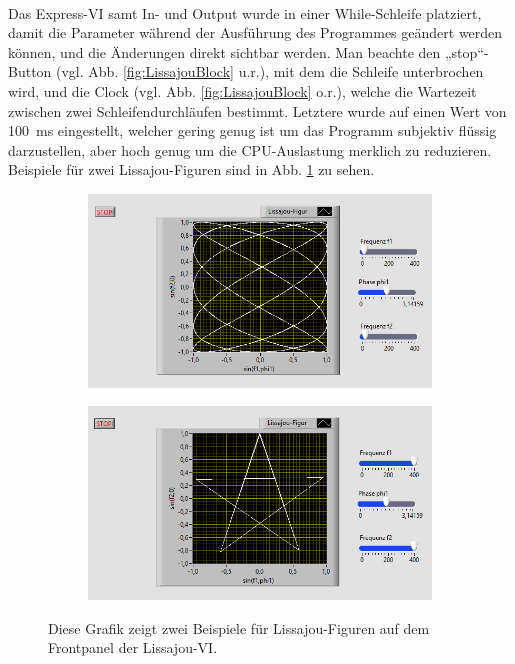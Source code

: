 \

Das Express-VI samt In- und Output wurde in einer While-Schleife platziert, damit die Parameter während der Ausführung des Programmes geändert werden können, und die Änderungen direkt sichtbar werden. Man beachte den „stop“-Button (vgl. Abb. \ref{fig:LissajouBlock} u.r.), mit dem die Schleife unterbrochen wird, und die Clock (vgl. Abb. \ref{fig:LissajouBlock} o.r.), welche die Wartezeit zwischen zwei Schleifendurchläufen bestimmt. Letztere wurde auf einen Wert von \SI{100}{\milli\second} eingestellt, welcher gering genug ist um das Programm subjektiv flüssig darzustellen, aber hoch genug um die CPU-Auslastung merklich zu reduzieren.
Beispiele für zwei Lissajou-Figuren sind in Abb. \ref{fig:LissajouFront} zu sehen.
\

\begin{figure}[H]
	\centering
	\begin{subfigure}[c]{\textwidth}
		\centering
		\includegraphics[width=\textwidth]{pic/LissFront1.png}
	\end{subfigure}
	\begin{subfigure}[c]{\textwidth}
		\centering
		\includegraphics[width=\textwidth]{pic/LissFront2.png}
	\end{subfigure}
	\caption{Diese Grafik zeigt zwei Beispiele für Lissajou-Figuren auf dem Frontpanel der Lissajou-VI.}
	\label{fig:LissajouFront}	
\end{figure}